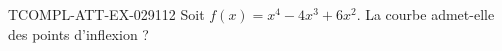 \begin{exercice}{TCOMPL-ATT-EX-029}{1}{12}
Soit $f(x) = x^4 - 4x^3 + 6x^2$. La courbe admet-elle des points d'inflexion ?

\end{exercice}
